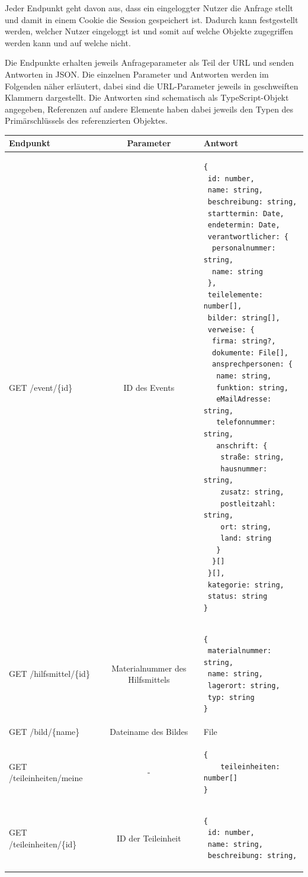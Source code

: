 Jeder Endpunkt geht davon aus, dass ein eingeloggter Nutzer die Anfrage stellt und damit in einem Cookie die Session gespeichert ist. Dadurch kann festgestellt werden, welcher Nutzer eingeloggt ist und somit auf welche Objekte zugegriffen werden kann und auf welche nicht.

Die Endpunkte erhalten jeweils Anfrageparameter als Teil der URL und senden Antworten in JSON. Die einzelnen Parameter und Antworten werden im Folgenden näher erläutert, dabei sind die URL-Parameter jeweils in geschweiften Klammern dargestellt. Die Antworten sind schematisch als TypeScript-Objekt angegeben, Referenzen auf andere Elemente haben dabei jeweils den Typen des Primärschlüssels des referenzierten Objektes.
\newpage
\begin{longtable}{l|c|l}
    Endpunkt & Parameter & Antwort \\
    \hline
    GET /event/\{id\} & ID des Events & \begin{lstlisting}[style=json-web-schnittstelle]
{
 id: number,
 name: string,
 beschreibung: string,
 starttermin: Date,
 endetermin: Date,
 verantwortlicher: {
  personalnummer: string,
  name: string
 },
 teilelemente: number[],
 bilder: string[],
 verweise: {
  firma: string?,
  dokumente: File[],
  ansprechpersonen: {
   name: string,
   funktion: string,
   eMailAdresse: string,
   telefonnummer: string,
   anschrift: {
    straße: string,
    hausnummer: string,
    zusatz: string,
    postleitzahl: string,
    ort: string,
    land: string
   }
  }[] 
 }[],
 kategorie: string,
 status: string
}
\end{lstlisting} \\
    \hline
    GET /hilfsmittel/\{id\} & Materialnummer des Hilfsmittels & \begin{lstlisting}[style=json-web-schnittstelle]
{
 materialnummer: string,
 name: string,
 lagerort: string,
 typ: string
}
    \end{lstlisting} \\
    \hline
    GET /bild/\{name\} & Dateiname des Bildes & File \\
    \hline
    GET /teileinheiten/meine & - & \begin{lstlisting}[style=json-web-schnittstelle]
{
    teileinheiten: number[]
}
    \end{lstlisting}\\
    \hline
    GET /teileinheiten/\{id\} & ID der Teileinheit & \begin{lstlisting}[style=json-web-schnittstelle]
{
 id: number,
 name: string,
 beschreibung: string,

\end{lstlisting}
\end{longtable}
